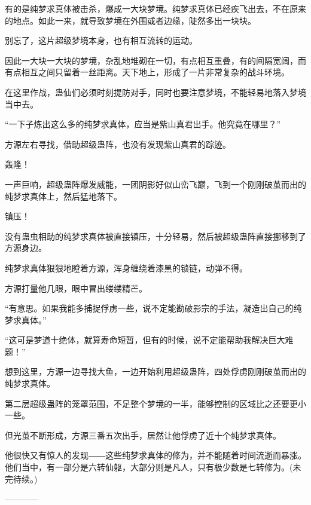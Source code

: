 \begin{this_body}
有的是纯梦求真体被击杀，爆成一大块梦境。纯梦求真体已经疾飞出去，不在原来的地点。如此一来，就导致梦境在外围或者边缘，陡然多出一块块。

别忘了，这片超级梦境本身，也有相互流转的运动。

因此一大块一大块的梦境，杂乱地堆砌在一切，有点相互重叠，有的间隔宽阔，而有点相互之间只留着一丝距离。天下地上，形成了一片非常复杂的战斗环境。

在这里作战，蛊仙们必须时刻提防对手，同时也要注意梦境，不能轻易地落入梦境当中去。

“一下子炼出这么多的纯梦求真体，应当是紫山真君出手。他究竟在哪里？”

方源左右寻找，借助超级蛊阵，也没有发现紫山真君的踪迹。

轰隆！

一声巨响，超级蛊阵爆发威能，一团阴影好似山峦飞巅，飞到一个刚刚破茧而出的纯梦求真体上，然后猛地落下。

镇压！

没有蛊虫相助的纯梦求真体被直接镇压，十分轻易，然后被超级蛊阵直接挪移到了方源身边。

纯梦求真体狠狠地瞪着方源，浑身缠绕着漆黑的锁链，动弹不得。

方源打量他几眼，眼中冒出缕缕精芒。

“有意思。如果我能多捕捉俘虏一些，说不定能勘破影宗的手法，凝造出自己的纯梦求真体。”

“这可是梦道十绝体，就算寿命短暂，但有的时候，说不定能帮助我解决巨大难题！”

想到这里，方源一边寻找大鱼，一边开始利用超级蛊阵，四处俘虏刚刚破茧而出的纯梦求真体。

第二层超级蛊阵的笼罩范围，不足整个梦境的一半，能够控制的区域比之还要更小一些。

但光茧不断形成，方源三番五次出手，居然让他俘虏了近十个纯梦求真体。

他很快又有惊人的发现――这些纯梦求真体的修为，并不能随着时间流逝而暴涨。他们当中，有一部分是六转仙躯，大部分则是凡人，只有极少数是七转修为。(未完待续。)

------------

\end{this_body}

